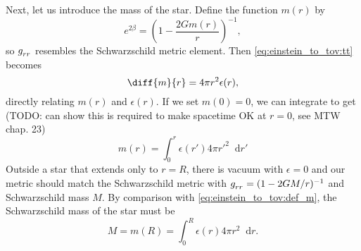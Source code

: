 \documentclass[a4paper,11pt,twoside]{report}
\newcommand\dif{\mathop{}\!\mathrm{d}}
\newcommand{\integral}[4]{\int_{#3}^{#4} #1 \dif #2}
\begin{document}
Next, let us introduce the mass of the star.
Define the function $m(r)$ by
\begin{equation}
	e^{2 \beta} = \left( 1 - \frac{2 G m(r)}{r} \right)^{-1} ,
	\label{eq:einstein_to_tov:def_m}
\end{equation}
so $g\indices{_r_r}$ resembles the Schwarzschild metric element.
Then \cref{eq:einstein_to_tov:tt} becomes
\begin{equation}
	\diff{m}{r} = 4 \pi r^2 \epsilon(r) ,
	\label{eq:einstein_to_tov:m_rho}
\end{equation}
directly relating $m(r)$ and $\epsilon(r)$.
If we set $m(0) = 0$, we can integrate to get
(TODO: can show this is required to make spacetime OK at $r=0$, see MTW chap. 23)
\begin{equation}
	m(r) = \integral{\epsilon(r') 4 \pi r'^2}{r'}{0}{r}
	\label{eq:einstein_to_tov:m_integral}
\end{equation}
Outside a star that extends only to $r = R$, there is vacuum with $\epsilon = 0$ and our metric should match the Schwarzschild metric with $g\indices{_r_r} = (1-2GM/r)^{-1}$ and Schwarzschild mass $M$.
By comparison with \cref{eq:einstein_to_tov:def_m}, the Schwarzschild mass of the star must be
\begin{equation}
	M = m(R) = \integral{\epsilon(r) 4 \pi r^2}{r}{0}{R} .
	\label{eq:einstein_to_tov:schwarzschild_mass}
\end{equation}
\end{document}
